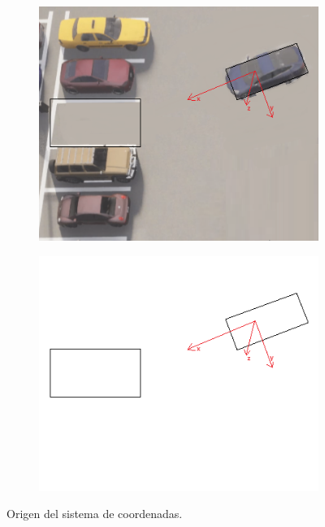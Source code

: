 \begin{figure}[!ht]
    \centering
    \begin{subfigure}{0.4\textwidth}
        \includegraphics[width=\textwidth]{img/distances_ubi_11}\label {fig:distances11}
    \end{subfigure}
    \begin{subfigure}{0.4\textwidth}
        \includegraphics[width=\textwidth]{img/distances_ubi_12}\label {fig:distances12}
    \end{subfigure}
    \caption{Origen del sistema de coordenadas.}
    \label{fig:coord}
\end{figure}
\clearpage

